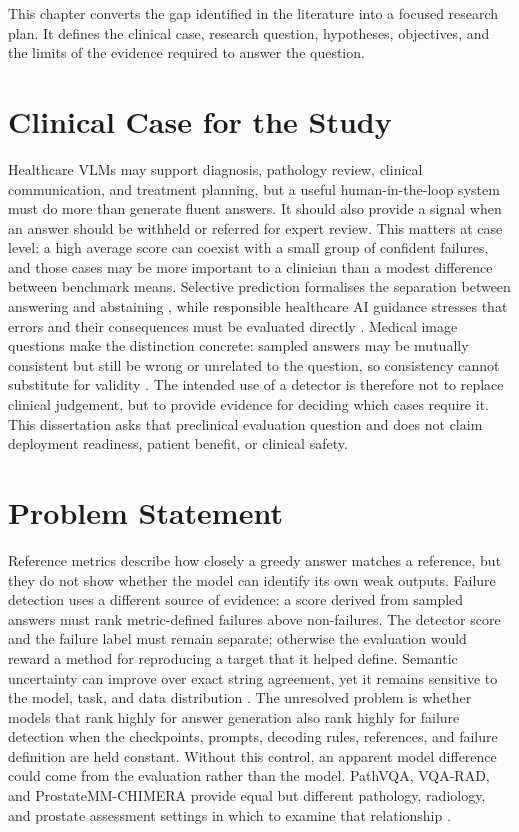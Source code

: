 This chapter converts the gap identified in the literature into a focused research plan. It defines the clinical case, research question, hypotheses, objectives, and the limits of the evidence required to answer the question.

\section{Clinical Case for the Study}

Healthcare VLMs may support diagnosis, pathology review, clinical communication, and treatment planning, but a useful human-in-the-loop system must do more than generate fluent answers. It should also provide a signal when an answer should be withheld or referred for expert review. This matters at case level: a high average score can coexist with a small group of confident failures, and those cases may be more important to a clinician than a modest difference between benchmark means. Selective prediction formalises the separation between answering and abstaining \citep{geifman2017selective}, while responsible healthcare AI guidance stresses that errors and their consequences must be evaluated directly \citep{wiens2019donoharm}. Medical image questions make the distinction concrete: sampled answers may be mutually consistent but still be wrong or unrelated to the question, so consistency cannot substitute for validity \citep{carlini2026qasnne}. The intended use of a detector is therefore not to replace clinical judgement, but to provide evidence for deciding which cases require it. This dissertation asks that preclinical evaluation question and does not claim deployment readiness, patient benefit, or clinical safety.

\section{Problem Statement}

Reference metrics describe how closely a greedy answer matches a reference, but they do not show whether the model can identify its own weak outputs. Failure detection uses a different source of evidence: a score derived from sampled answers must rank metric-defined failures above non-failures. The detector score and the failure label must remain separate; otherwise the evaluation would reward a method for reproducing a target that it helped define. Semantic uncertainty can improve over exact string agreement, yet it remains sensitive to the model, task, and data distribution \citep{farquhar2024semanticentropy,ovadia2019uncertainty}. The unresolved problem is whether models that rank highly for answer generation also rank highly for failure detection when the checkpoints, prompts, decoding rules, references, and failure definition are held constant. Without this control, an apparent model difference could come from the evaluation rather than the model. PathVQA, VQA-RAD, and ProstateMM-CHIMERA provide equal but different pathology, radiology, and prostate assessment settings in which to examine that relationship \citep{he2020pathvqa,lau2018vqarad,chimera2025task1}.

